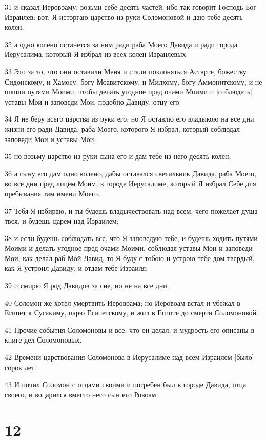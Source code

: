 \par 31 и сказал Иеровоаму: возьми себе десять частей, ибо так говорит Господь Бог Израилев: вот, Я исторгаю царство из руки Соломоновой и даю тебе десять колен,
\par 32 а одно колено останется за ним ради раба Моего Давида и ради города Иерусалима, который Я избрал из всех колен Израилевых.
\par 33 Это за то, что они оставили Меня и стали поклоняться Астарте, божеству Сидонскому, и Хамосу, богу Моавитскому, и Милхому, богу Аммонитскому, и не пошли путями Моими, чтобы делать угодное пред очами Моими и [соблюдать] уставы Мои и заповеди Мои, подобно Давиду, отцу его.
\par 34 Я не беру всего царства из руки его, но Я оставлю его владыкою на все дни жизни его ради Давида, раба Моего, которого Я избрал, который соблюдал заповеди Мои и уставы Мои;
\par 35 но возьму царство из руки сына его и дам тебе из него десять колен;
\par 36 а сыну его дам одно колено, дабы оставался светильник Давида, раба Моего, во все дни пред лицем Моим, в городе Иерусалиме, который Я избрал Себе для пребывания там имени Моего.
\par 37 Тебя Я избираю, и ты будешь владычествовать над всем, чего пожелает душа твоя, и будешь царем над Израилем;
\par 38 и если будешь соблюдать все, что Я заповедую тебе, и будешь ходить путями Моими и делать угодное пред очами Моими, соблюдая уставы Мои и заповеди Мои, как делал раб Мой Давид, то Я буду с тобою и устрою тебе дом твердый, как Я устроил Давиду, и отдам тебе Израиля;
\par 39 и смирю Я род Давидов за сие, но не на все дни.
\par 40 Соломон же хотел умертвить Иеровоама; но Иеровоам встал и убежал в Египет к Сусакиму, царю Египетскому, и жил в Египте до смерти Соломоновой.
\par 41 Прочие события Соломоновы и все, что он делал, и мудрость его описаны в книге дел Соломоновых.
\par 42 Времени царствования Соломонова в Иерусалиме над всем Израилем [было] сорок лет.
\par 43 И почил Соломон с отцами своими и погребен был в городе Давида, отца своего, и воцарился вместо него сын его Ровоам.

\chapter{12}

